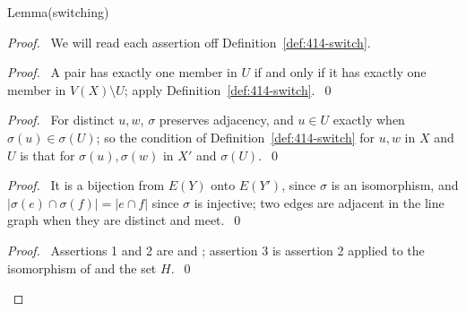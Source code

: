 \begin{namedresult}{Lemma}{(switching)}\label{lem:414-switch}
\end{namedresult}
\begin{proof}
 \pfsketch\ We will read each assertion off Definition~\ref{def:414-switch}.
 \begin{proof}\pf\ A pair has exactly one member in $U$ if and only if it has exactly one member
  in $V(X)\setminus U$; apply Definition~\ref{def:414-switch}.~\qed\end{proof}
 \begin{proof}\pf\ For distinct $u,w$, $\sigma$ preserves adjacency, and $u\in U$ exactly when
  $\sigma(u)\in\sigma(U)$; so the condition of Definition~\ref{def:414-switch} for $u,w$ in $X$
  and $U$ is that for $\sigma(u),\sigma(w)$ in $X'$ and $\sigma(U)$.~\qed\end{proof}
 \begin{proof}\pf\ It is a bijection from $E(Y)$ onto $E(Y')$, since $\sigma$ is an isomorphism,
  and $|\sigma(e)\cap\sigma(f)|=|e\cap f|$ since $\sigma$ is injective; two edges are adjacent in
  the line graph when they are distinct and meet.~\qed\end{proof}
 \qedstep
 \begin{proof}\pf\ Assertions 1 and 2 are  and ;
  assertion 3 is assertion 2 applied to the isomorphism of  and the set
  $H$.~\qed\end{proof}
\end{proof}


